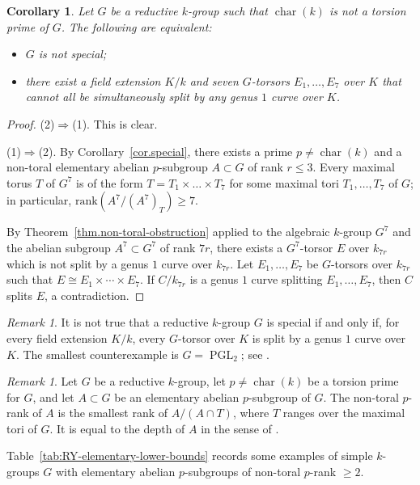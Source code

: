\documentclass[12pt]{amsart}
\numberwithin{equation}{section}
\newtheorem{corollary}[theorem]{Corollary}
\theoremstyle{remark}
\newtheorem{remark}[theorem]{Remark}
\newcommand{\PGL}{\operatorname{PGL}}
\newcommand{\Char}{\operatorname{char}}
\begin{document}
\begin{corollary}\label{cor:special-splitting-genus-one}
   Let $G$ be a reductive $k$-group such that $\Char(k)$ is not a torsion prime of $G$. The following are equivalent:
    \begin{itemize}
        \item[(1)] $G$ is not special;
                \item[(2)] there exist a field extension $K/k$ and seven $G$-torsors $E_1,\dots,E_7$ over $K$ that cannot all be simultaneously split by any genus $1$ curve over $K$.
    \end{itemize}
\end{corollary}

\begin{proof}
(2)$\Longrightarrow$(1). This is clear.

\smallskip

(1)$\Longrightarrow$(2). By Corollary~\ref{cor.special}, there exists a prime $p\neq \operatorname{char}(k)$ and a non-toral elementary abelian $p$-subgroup $A\subset G$ of rank $r\leqslant 3$. Every maximal torus $T$ of $G^7$ is of the form $T = T_1 \times \ldots \times T_7$ for some maximal tori $T_1, \ldots, T_7$ of $G$; in particular, $\mathrm{rank}(A^7/(A^7)_T)\geqslant 7$.

By Theorem~\ref{thm.non-toral-obstruction} applied to the algebraic $k$-group $G^7$ and the abelian subgroup $A^7\subset G^7$ of rank $7r$, there exists a $G^7$-torsor $E$ over $k_{7r}$ which is not split by a genus $1$ curve over $k_{7r}$. Let $E_1,\dots,E_7$ be $G$-torsors over $k_{7r}$ such that $E\cong E_1\times\cdots\times E_7$. If $C/k_{7r}$ is a genus $1$ curve splitting $E_1,\dots,E_7$, then $C$ splits $E$, a contradiction.
\end{proof}

\begin{remark}
    It is not true that a reductive $k$-group $G$ is special if and only if, for every field extension $K/k$, every $G$-torsor over $K$ is split by a genus $1$ curve over $K$. The smallest counterexample is $G=\PGL_2$; see \cite{swets}.
\end{remark}

\begin{remark}
    Let $G$ be a reductive $k$-group, let $p\neq\Char(k)$ be a torsion prime for $G$, and let $A\subset G$ be an elementary abelian $p$-subgroup of $G$. The non-toral $p$-rank of $A$ is the smallest rank of $A/(A\cap T)$, where $T$ ranges over the maximal tori of $G$. It is equal to the depth of $A$ in the sense of \cite[Definition~4.5]{reichstein-youssin2}.

    Table~\ref{tab:RY-elementary-lower-bounds} records some examples of simple $k$-groups $G$ with elementary abelian $p$-subgroups of non-toral $p$-rank $\geqslant 2$.
 \end{remark}
 
\end{document}
